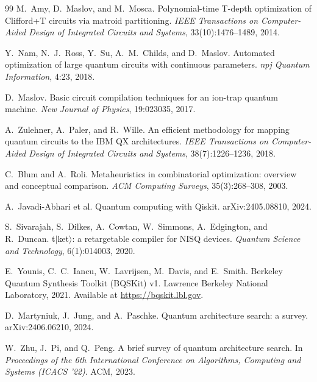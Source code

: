 \documentclass[11pt]{article}
\begin{document}
\begin{thebibliography}{99}
M.~Amy, D.~Maslov, and M.~Mosca.
\newblock Polynomial-time T-depth optimization of Clifford+T circuits via
matroid partitioning.
\newblock \emph{IEEE Transactions on Computer-Aided Design of Integrated
Circuits and Systems}, 33(10):1476--1489, 2014.

Y.~Nam, N.~J.~Ross, Y.~Su, A.~M.~Childs, and D.~Maslov.
\newblock Automated optimization of large quantum circuits with continuous
parameters.
\newblock \emph{npj Quantum Information}, 4:23, 2018.

D.~Maslov.
\newblock Basic circuit compilation techniques for an ion-trap quantum
machine.
\newblock \emph{New Journal of Physics}, 19:023035, 2017.

A.~Zulehner, A.~Paler, and R.~Wille.
\newblock An efficient methodology for mapping quantum circuits to the IBM
QX architectures.
\newblock \emph{IEEE Transactions on Computer-Aided Design of Integrated
Circuits and Systems}, 38(7):1226--1236, 2018.

C.~Blum and A.~Roli.
\newblock Metaheuristics in combinatorial optimization: overview and
conceptual comparison.
\newblock \emph{ACM Computing Surveys}, 35(3):268--308, 2003.

A.~Javadi-Abhari et al.
\newblock Quantum computing with Qiskit.
\newblock arXiv:2405.08810, 2024.

S.~Sivarajah, S.~Dilkes, A.~Cowtan, W.~Simmons, A.~Edgington, and R.~Duncan.
\newblock t$|$ket$\rangle$: a retargetable compiler for NISQ devices.
\newblock \emph{Quantum Science and Technology}, 6(1):014003, 2020.

E.~Younis, C.~C.~Iancu, W.~Lavrijsen, M.~Davis, and E.~Smith.
\newblock Berkeley Quantum Synthesis Toolkit (BQSKit) v1.
\newblock Lawrence Berkeley National Laboratory, 2021.
\newblock Available at \url{https://bqskit.lbl.gov}.

D.~Martyniuk, J.~Jung, and A.~Paschke.
\newblock Quantum architecture search: a survey.
\newblock arXiv:2406.06210, 2024.

W.~Zhu, J.~Pi, and Q.~Peng.
\newblock A brief survey of quantum architecture search.
\newblock In \emph{Proceedings of the 6th International Conference on
Algorithms, Computing and Systems (ICACS '22)}. ACM, 2023.


\end{thebibliography}
\end{document}
